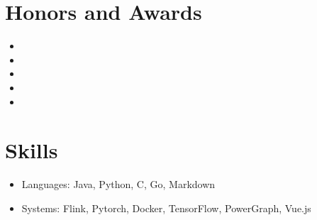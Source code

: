 \documentclass{resume}
\begin{document}
\section{Honors and Awards}
\begin{itemize}[parsep=0.5ex]
  \item {}
  \item {}
  \item {}
  \item {}
  \item {}
\end{itemize}

\section{Skills}
\begin{itemize}[parsep=0.5ex]
  \item Languages: Java, Python, C, Go, Markdown
  \item Systems: Flink, Pytorch, Docker, TensorFlow, PowerGraph, Vue.js
\end{itemize}

%
%
\end{document}
